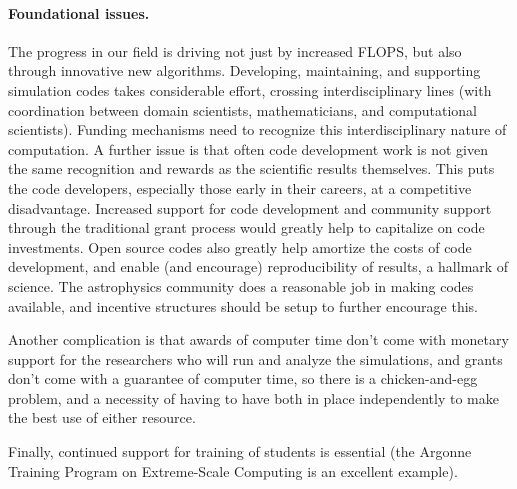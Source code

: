 \documentclass[11pt,twocolumn]{article}
\begin{document}
\paragraph*{Foundational issues.}

The progress in our field is driving not just by increased FLOPS, but
also through innovative new algorithms.  Developing, maintaining, and
supporting simulation codes takes considerable effort, crossing
interdisciplinary lines (with coordination between domain scientists,
mathematicians, and computational scientists).  Funding mechanisms
need to recognize this interdisciplinary nature of computation.  A
further issue is that often code development work is not given
the same recognition and rewards as the scientific results themselves.
This puts the code developers, especially those early in their
careers, at a competitive disadvantage.  Increased support for code
development and community support through the traditional grant
process would greatly help to capitalize on code investments.  Open
source codes also greatly help amortize the costs of code development,
and enable (and encourage) reproducibility of results, a hallmark of
science.  The astrophysics community does a reasonable job in making
codes available, and incentive structures should be setup to further
encourage this.

Another complication is that awards of computer time don't come with
monetary support for the researchers who will run and analyze the
simulations, and grants don't come with a guarantee of computer time,
so there is a chicken-and-egg problem, and a necessity of having to
have both in place independently to make the best use of either
resource.

Finally, continued support for training of students is essential (the
Argonne Training Program on Extreme-Scale Computing is an excellent
example).
\end{document}
